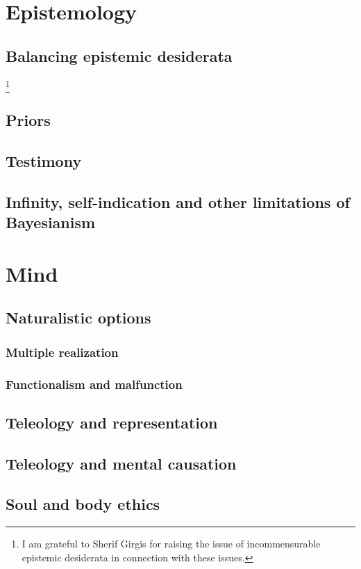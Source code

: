 \def\mychapter{V}

\chapter{Epistemology}\label{ch:epistemology}
\section{Balancing epistemic desiderata}
\footnote{I am grateful to Sherif Girgis for raising the issue of incommensurable epistemic desiderata in connection with these issues.}
\section{Priors}
\section{Testimony}
\section{Infinity, self-indication and other limitations of Bayesianism}
\chaptertail 

\def\mychapter{VI}

\chapter{Mind}\label{ch:mind}
\section{Naturalistic options}
\subsection{Multiple realization}
\subsection{Functionalism and malfunction}
\section{Teleology and representation}
\section{Teleology and mental causation}
\section{Soul and body ethics}
\chaptertail 

